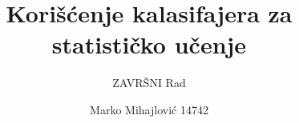 \title{Korišćenje kalasifajera za statističko učenje}

\subtitle{ZAVRŠNI Rad}

\author{Marko Mihajlović 14742}







     
